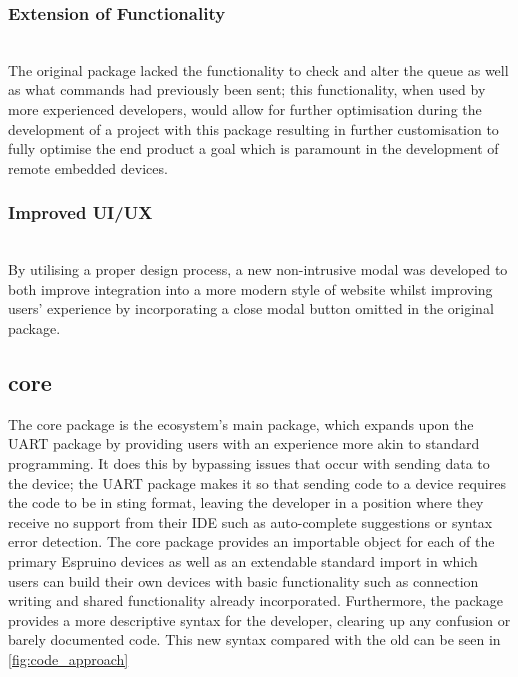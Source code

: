 \documentclass{l4proj}
\begin{document}
\subsubsection{Extension of Functionality}\hfill\\
The original package lacked the functionality to check and alter the queue as well as what commands had previously been sent; this functionality, when used by more experienced developers, would allow for further optimisation during the development of a project with this package resulting in further customisation to fully optimise the end product a goal which is paramount in the development of remote embedded devices.
\\ 
\subsubsection{Improved UI/UX}\hfill\\
By utilising a proper design process, a new non-intrusive modal was developed to both improve integration into a more modern style of website whilst improving users' experience by incorporating a close modal button omitted in the original package.

\subsection{core}

The core package is the ecosystem's main package, which expands upon the UART package by providing users with an experience more akin to standard programming. It does this by bypassing issues that occur with sending data to the device; the UART package makes it so that sending code to a device requires the code to be in sting format, leaving the developer in a position where they receive no support from their IDE such as auto-complete suggestions or syntax error detection. The core package provides an importable object for each of the primary Espruino devices as well as an extendable standard import in which users can build their own devices with basic functionality such as connection writing and shared functionality already incorporated. Furthermore, the package provides a more descriptive syntax for the developer, clearing up any confusion or barely documented code. This new syntax compared with the old can be seen in \ref{fig:code_approach}
\end{document}
